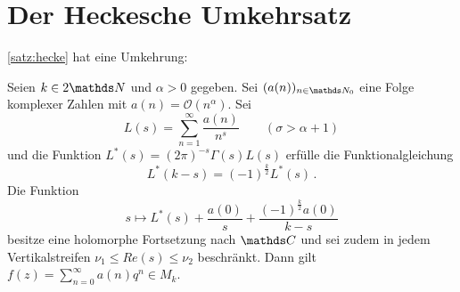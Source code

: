 \section{Der Heckesche Umkehrsatz}

\autoref{satz:hecke} hat eine Umkehrung:

\begin{satz}[Hecke]
	Seien $k \in 2\NN$ und $\alpha > 0$ gegeben.
	Sei $(a(n))_{n\in\NN_0}$ eine Folge komplexer Zahlen mit $a(n) = \mathcal{O}(n^\alpha)$.
	Sei
	\[
		L(s) = \sum_{n=1}^\infty \frac{a(n)}{n^s}
		\qquad (\sigma > \alpha +1)
	\]
	und die Funktion $L^*(s) = (2\pi)^{-s} \Gamma(s) L(s)$ erfülle die Funktionalgleichung
	\[
		L^*(k-s) = (-1)^{\frac{k}{2}}L^*(s)
		\,.
	\]
	Die Funktion 
	\[
	s \mapsto L^*(s) + \frac{a(0)}{s} + \frac{(-1)^{\frac{k}{2}} a(0)}{k-s}
	\]
	besitze eine holomorphe Fortsetzung nach $\CC$ und sei zudem in jedem Vertikalstreifen $\nu_1 \leq Re(s) \leq \nu_2$ beschränkt. Dann gilt $f(z) = \sum_{n=0}^\infty a(n)q^n \in M_k$.
\end{satz}

